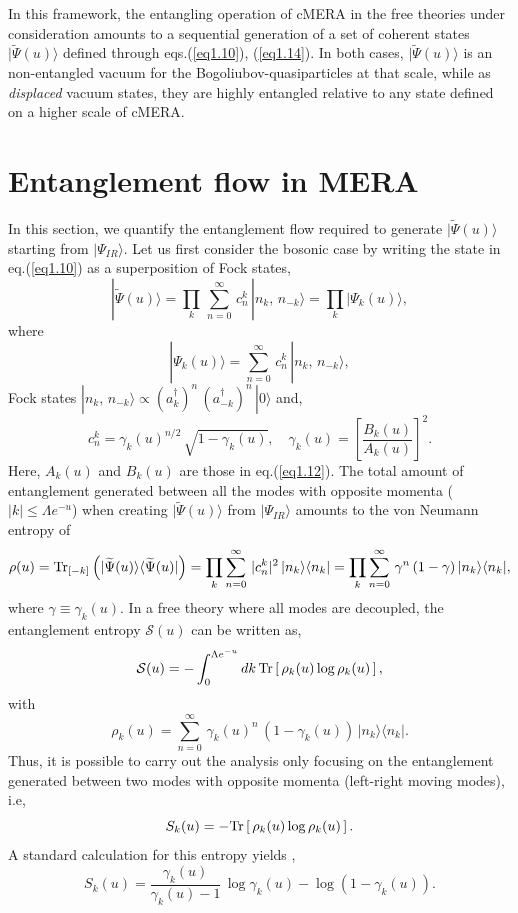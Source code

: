 \documentclass[preprint,aps]{revtex4}
\def\barray{\begin{eqnarray}}
\def\earray{\end{eqnarray}}
\def\beq{\begin{equation}}
\def\eeq{\end{equation}}
\begin{document}
In this framework, the entangling operation of cMERA in the free theories under consideration amounts to a sequential generation of a set of coherent states $|\widetilde{\Psi}(u)\rangle$ defined through eqs.(\ref{eq1.10}), (\ref{eq1.14}). In both cases, $|\widetilde{\Psi}(u)\rangle$ is an non-entangled vacuum for the Bogoliubov-quasiparticles at that scale, while as  \textit{displaced} vacuum states, they are highly entangled relative to any state defined on a higher scale of cMERA. 

\section{Entanglement flow in MERA}
\label{Entanglement}
In this section, we quantify the entanglement flow required to generate $|\widetilde{\Psi}(u)\rangle$ starting from $|\Psi_{IR}\rangle$. Let us first consider the bosonic case by writing the state in eq.(\ref{eq1.10}) as a superposition of Fock states,
\beq
\label{eq2.1}
|\widetilde{\Psi}(u)\rangle= \prod_{k}\, \sum_{n=0}^{\infty}\, c_n^k\, |n_k,\, n_{-k}\rangle =  \prod_{k} |\Psi_k(u)\rangle ,
\eeq
where
\beq
\label{eq2.1i}
|\Psi_k(u)\rangle = \sum_{n=0}^{\infty}\, c_n^k\, |n_k,\, n_{-k}\rangle,
\eeq
Fock states $|n_k,\, n_{-k}\rangle \propto (a_k^{\dagger})^n\, (a_{-k}^{\dagger})^n\, |0\rangle$ and,
\beq
\label{eq2.2}
c_n^k = \gamma_k(u)^{n/2}\, \sqrt{1-\gamma_k(u)}, \quad \gamma_k(u) = \left[ \frac{B_k(u)}{A_k(u)}\right] ^2.
\eeq
Here, $A_k(u)$ and $B_k(u)$ are those in eq.(\ref{eq1.12}). The total amount of entanglement generated between all the modes with opposite momenta ($|k| \leq \Lambda e^{-u}$) when creating $|\widetilde{\Psi}(u)\rangle$ from $|\Psi_{IR}\rangle$ amounts to the von Neumann entropy of
\barray
\label{eq2.3}
\rho(u)={\rm Tr}_{[-k]}\left(|\widetilde{\Psi}(u)\rangle \langle \widetilde{\Psi}(u)|\right)  = \prod_{k} \sum_{n=0}^{\infty}\, \vert c^k_n\vert^2\,  |n_k\rangle \langle n_k| =\prod_{k} \sum_{n=0}^{\infty}\, \gamma^n\, (1-\gamma)\,  |n_k\rangle \langle n_k|,  
\earray
where $\gamma \equiv \gamma_k(u)$. In a free theory where all modes are decoupled, the entanglement entropy $\mathcal{S}(u)$ can be written as,
\beq
\label{eq2.4}
\mathcal{S}(u) = -\int_{0}^{\Lambda e^{-u}}  dk\, {\rm Tr}\left[\, \rho_k(u)\log \rho_k(u)\, \right],
\eeq
with
\beq
\label{eq2.4i}
\rho_k(u)= \sum_{n=0}^{\infty}\, \gamma_k(u)^n\, (1-\gamma_k(u))\,  |n_k\rangle \langle n_k|.
\eeq
Thus, it is possible to carry out the analysis only focusing on the entanglement generated between two modes with opposite momenta (left-right moving modes), i.e,
\beq
\label{eq2.4ii}
S_k(u)=-{\rm Tr}\left[\, \rho_k(u)\log \rho_k(u)\, \right]. 
\eeq
A standard calculation for this entropy yields \cite{bombelli},
\beq
\label{eq2.5}
S_k(u)=\frac{\gamma_k(u)}{\gamma_k(u)-1}\, \log \gamma_k(u) - \log(1-\gamma_k(u)).
\eeq
\end{document}
